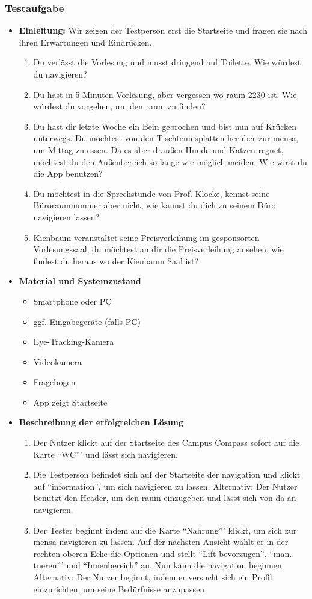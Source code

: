 \subsubsection*{Testaufgabe}
\begin{itemize}
\item \textbf{Einleitung:} Wir zeigen der Testperson erst die Startseite und fragen sie nach ihren Erwartungen und Eindrücken.
\begin{enumerate}
\item Du verlässt die Vorlesung und musst dringend auf Toilette. Wie würdest du navigieren?
\item Du hast in 5 Minuten Vorlesung, aber vergessen wo \gls{raum} 2230 ist. Wie würdest du vorgehen, um den \gls{raum} zu finden?
\item Du hast dir letzte Woche ein Bein gebrochen und bist nun auf Krücken unterwegs. Du möchtest von den Tischtennisplatten herüber zur \gls{mensa}, um Mittag zu essen. Da es aber draußen Hunde und Katzen regnet, möchtest du den Außenbereich so lange wie möglich meiden. Wie wirst du die App benutzen?
\item Du möchtest in die Sprechstunde von Prof. Klocke, kennst seine Büroraumnummer aber nicht, wie kannst du dich zu seinem Büro navigieren lassen?
\item Kienbaum veranstaltet seine Preisverleihung im gesponsorten Vorlesungssaal, du möchtest an dir die Preisverleihung ansehen, wie findest du heraus wo der Kienbaum Saal ist?
\end{enumerate}
\newpage
\item \textbf{Material und Systemzustand}
\begin{itemize}
\item Smartphone oder PC
\item ggf. Eingabegeräte (falls PC)
\item Eye-Tracking-Kamera
\item Videokamera
\item Fragebogen
\item App zeigt Startseite
\end{itemize}
\item \textbf{Beschreibung der erfolgreichen Lösung}
\begin{enumerate}
\item Der Nutzer klickt auf der Startseite des Campus Compass sofort auf die Karte "`WC"'' und lässt sich navigieren.
\item Die Testperson befindet sich auf der Startseite der \gls{navigation} und klickt auf "`\gls{information}"', um sich navigieren zu lassen.
Alternativ: Der Nutzer benutzt den Header, um den \gls{raum} einzugeben und lässt sich von da an navigieren.
\item Der Tester beginnt indem auf die Karte "`Nahrung"'' klickt, um sich zur \gls{mensa} navigieren zu lassen. Auf der nächsten Ansicht wählt er in der rechten oberen Ecke die Optionen und stellt "`Lift bevorzugen"', "`man. \gls{tuer}en"'' und "`Innenbereich"' an. Nun kann die \gls{navigation} beginnen.
Alternativ: Der Nutzer beginnt, indem er versucht sich ein Profil einzurichten, um seine Bedürfnisse anzupassen.
\end{enumerate}
\end{itemize}
\newpage
